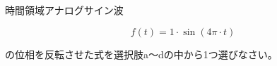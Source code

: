 時間領域アナログサイン波

\[
f(t) = 1 \cdot \sin( 4 \pi \cdot t )
\]

\bigskip
\noindent  の位相を反転させた式を選択肢a〜dの中から1つ選びなさい。
